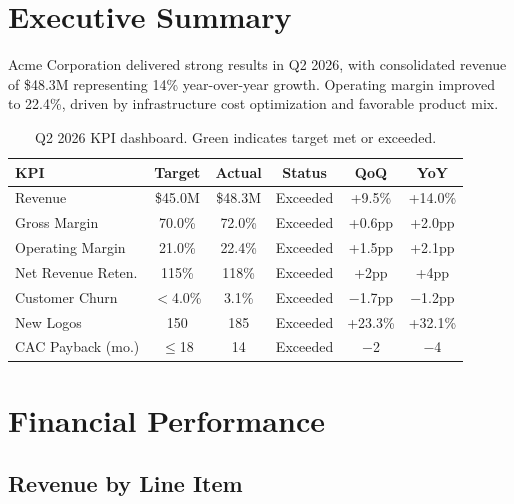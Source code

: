 \documentclass[
    language=english,
    doctype=quarterly-report,
    institution=none,
]{../../omnilatex}
\begin{document}
\maketitle

\section*{Executive Summary}

Acme Corporation delivered strong results in Q2 2026, with consolidated
revenue of \$48.3M representing 14\% year-over-year growth. Operating margin
improved to 22.4\%, driven by infrastructure cost optimization and favorable
product mix.

\begin{table}[h]
    \centering
    \begin{tabular}{lccccc}
        \toprule
        \textbf{KPI} & \textbf{Target} & \textbf{Actual} & \textbf{Status} & \textbf{QoQ} & \textbf{YoY} \\
        \midrule
        Revenue            & \$45.0M & \$48.3M & \cellcolor{green!20}Exceeded & +9.5\%  & +14.0\% \\
        Gross Margin       & 70.0\%  & 72.0\%  & \cellcolor{green!20}Exceeded & +0.6pp & +2.0pp \\
        Operating Margin   & 21.0\%  & 22.4\%  & \cellcolor{green!20}Exceeded & +1.5pp & +2.1pp \\
        Net Revenue Reten. & 115\%   & 118\%   & \cellcolor{green!20}Exceeded & +2pp    & +4pp \\
        Customer Churn     & $<$4.0\% & 3.1\%  & \cellcolor{green!20}Exceeded & $-$1.7pp & $-$1.2pp \\
        New Logos          & 150     & 185     & \cellcolor{green!20}Exceeded & +23.3\% & +32.1\% \\
        CAC Payback (mo.)  & $\leq$18 & 14     & \cellcolor{green!20}Exceeded & $-$2    & $-$4 \\
        \bottomrule
    \end{tabular}
    \caption{Q2 2026 KPI dashboard. Green indicates target met or exceeded.}
\end{table}

\section{Financial Performance}

\subsection{Revenue by Line Item}
\end{document}
